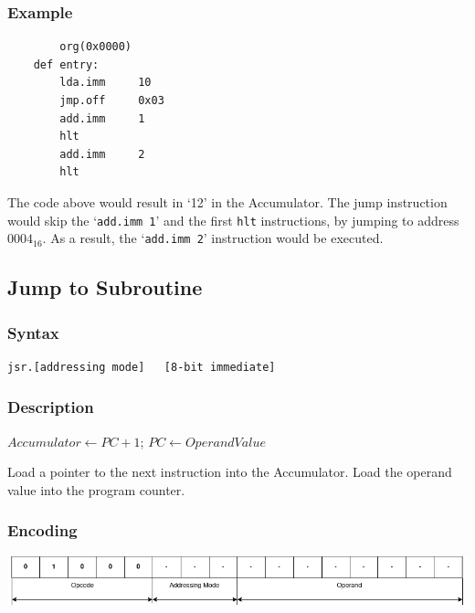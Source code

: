     \subsubsection{Example}
    \begin{verbatim}
        org(0x0000)
    def entry:
        lda.imm     10
        jmp.off     0x03
        add.imm     1
        hlt
        add.imm     2
        hlt
    \end{verbatim}
    \par The code above would result in `12' in the Accumulator.
    The jump instruction would skip the `\texttt{add.imm 1}'  and  the first \texttt{hlt} instructions, by jumping to address $0004_{16}$.
    As a result, the `\texttt{add.imm 2}' instruction would be executed.

\pagebreak
\subsection{Jump to Subroutine}\label{subsec:jsr}
    \subsubsection{Syntax}
    \begin{verbatim}jsr.[addressing mode]   [8-bit immediate]\end{verbatim}
    \subsubsection{Description}
    $Accumulator \leftarrow PC + 1$; $PC \leftarrow OperandValue$
    \par Load a pointer to the next instruction into the Accumulator.
    Load the operand value into the program counter.
    \subsubsection{Encoding}
    \begin{center}
        \includegraphics[scale=0.40]{img/Andromeda-JSR.drawio}
    \end{center}


